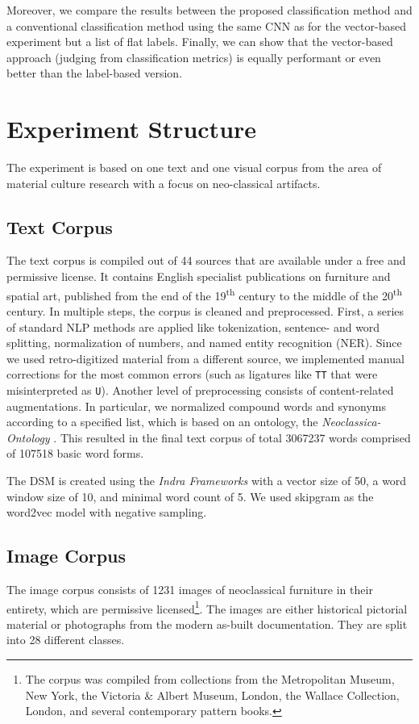 Moreover, we compare the results between the proposed classification method and a conventional classification method using the same CNN as for the vector-based experiment but a list of flat labels. Finally, we can show that the vector-based approach (judging from classification metrics) is equally performant or even better than the label-based version.


\section{Experiment Structure}
The experiment is based on one text and one visual corpus from the area of material culture research with a focus on neo-classical artifacts.

\subsection{Text Corpus}
The text corpus is compiled out of 44 sources that are available under a free and permissive license. It contains English specialist publications on furniture and spatial art, published from the end of the 19\textsuperscript{th} century to the middle of the 20\textsuperscript{th} century. In multiple steps, the corpus is cleaned and preprocessed. First, a series of standard NLP methods are applied like tokenization, sentence- and word splitting, normalization of numbers, and named entity recognition (NER). Since we used retro-digitized material from a different source, we implemented manual corrections for the most common errors (such as ligatures like \texttt{TT} that were misinterpreted as \texttt{U}). Another level of preprocessing consists of content-related augmentations. In particular, we normalized compound words and synonyms according to a specified list, which is based on an ontology, the \emph{Neoclassica-Ontology} \parencite{donig_NeoclassicaMultilingualDomainOntology_2016}. This resulted in the final text corpus of total \num{3067237} words comprised of \num{107518} basic word forms.

The DSM is created using the \emph{Indra Frameworks} \parencite{sales_IndraWordEmbeddingSemanticRelatedness_2018a} with a vector size of \num{50}, a word window size of \num{10}, and minimal word count of \num{5}. We used skipgram as the word2vec model \parencite{mikolov_EfficientEstimationWordRepresentationsVector_2013} with negative sampling.

\subsection{Image Corpus}
The image corpus consists of \num{1231} images of neoclassical furniture in their entirety, which are permissive licensed\footnote{The corpus was compiled from collections from the Metropolitan Museum, New York, the Victoria \& Albert Museum, London, the Wallace Collection, London, and several contemporary pattern books.}. The images are either historical pictorial material or photographs from the modern as-built documentation. They are split into \num{28} different classes.

